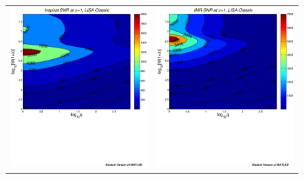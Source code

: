 \documentclass{iopart}
\begin{document}
%
\begin{figure}[H]
\begin{center}
\begin{tabular}{cc}
\includegraphics[scale=0.41,clip=true]{FigEmanuele/InspSNRContourz1.ps}
&\includegraphics[scale=0.41,clip=true]{FigEmanuele/IMRSNRContourz1.ps}\\

\end{tabular}
\end{center}
\end{figure}
\end{document}
